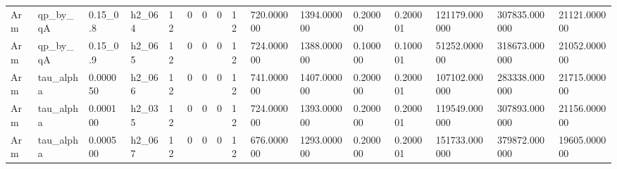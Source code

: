 \begin{tabular}{llllllllllllllll}
Arm & qp\_by\_qA & 0.15\_0.8 & h2\_064 & 12 & 0 & 0 & 0 & 12 & 720.000000 & 1394.000000 & 0.200000 & 0.200001 & 121179.000000 & 307835.000000 & 21121.000000 \\
Arm & qp\_by\_qA & 0.15\_0.9 & h2\_065 & 12 & 0 & 0 & 0 & 12 & 724.000000 & 1388.000000 & 0.100000 & 0.100001 & 51252.000000 & 318673.000000 & 21052.000000 \\
Arm & tau\_alpha & 0.000050 & h2\_066 & 12 & 0 & 0 & 0 & 12 & 741.000000 & 1407.000000 & 0.200000 & 0.200001 & 107102.000000 & 283338.000000 & 21715.000000 \\
Arm & tau\_alpha & 0.000100 & h2\_035 & 12 & 0 & 0 & 0 & 12 & 724.000000 & 1393.000000 & 0.200000 & 0.200001 & 119549.000000 & 307893.000000 & 21156.000000 \\
Arm & tau\_alpha & 0.000500 & h2\_067 & 12 & 0 & 0 & 0 & 12 & 676.000000 & 1293.000000 & 0.200000 & 0.200001 & 151733.000000 & 379872.000000 & 19605.000000 \\
\end{tabular}
